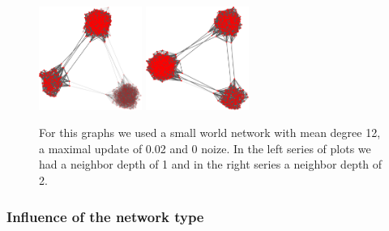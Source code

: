 \begin{figure}
\includegraphics[width=0.3\textwidth]{batchRun__kHalf=6-6-6_maxUpdate=0.02_noize=0_nbrDepth=1/network1000-crop.pdf}
\hskip2cm
\includegraphics[width=0.3\textwidth]{batchRun__kHalf=6-6-6_maxUpdate=0.02_noize=0_nbrDepth=2/network1000-crop.pdf}

\caption{For this graphs we used a small world network with mean degree 12, a maximal update of 0.02 and 0 noize. In the left series of plots we had a neighbor depth of 1 and in the right series a neighbor depth of 2.}
\label{influencenbrdepth}
\end{figure}

\subsubsection{Influence of the network type}
\label{sec:influencenetworktype}



